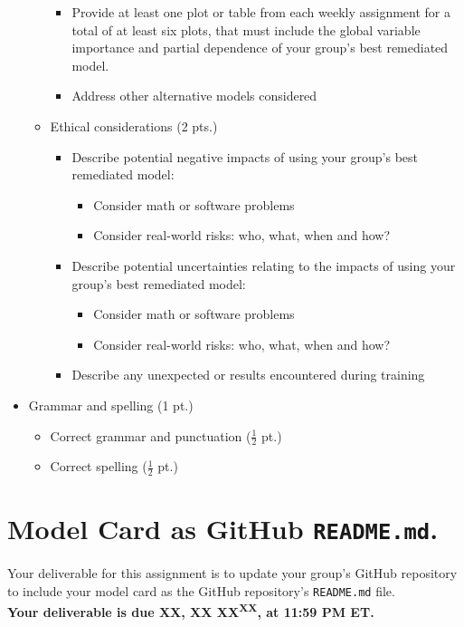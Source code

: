 \documentclass[fleqn]{article}
\begin{document}
\begin{itemize}
\begin{itemize}
\begin{itemize}
			\item Provide at least one plot or table from each weekly assignment for a total of at least six plots, that must include the global variable importance and partial dependence of your group's best remediated model.
			\item Address other alternative models considered
		\end{itemize}
		\item Ethical considerations (2 pts.)
		\begin{itemize}
			\item Describe potential negative impacts of using your group's best remediated model: 
			\begin{itemize}
			\item Consider math or software problems
			\item Consider real-world risks: who, what, when and how?
			\end{itemize}
			\item Describe potential uncertainties relating to the impacts of using your group's best remediated model:
			\begin{itemize} 
				\item Consider math or software problems
				\item Consider real-world risks: who, what, when and how?
			\end{itemize}
			\item Describe any unexpected or results encountered during training
		\end{itemize}
	\end{itemize}
	\item Grammar and spelling (1 pt.)
	\begin{itemize} 
		\item Correct grammar and punctuation ($\frac{1}{2}$ pt.)
		\item Correct spelling ($\frac{1}{2}$ pt.)
	\end{itemize}
\end{itemize}


\section{Model Card as GitHub \texttt{README.md}.}

Your deliverable for this assignment is to update your group's GitHub repository to include your model card as the GitHub repository's \texttt{README.md} file.\\

\noindent \textbf{Your deliverable is due XX, XX XX\textsuperscript{XX}, at 11:59 PM ET.}\\
\end{document}
